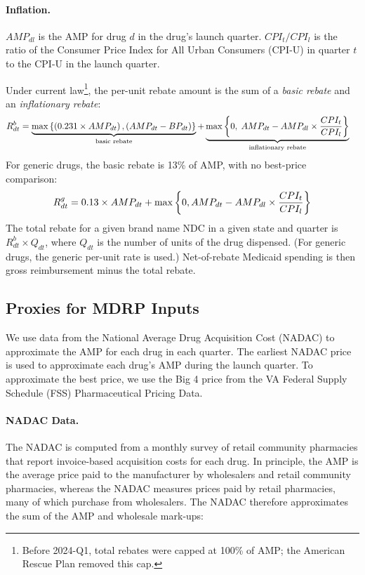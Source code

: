 \paragraph{Inflation.} $AMP_{dl}$ is the AMP for drug $d$ in the drug's launch quarter. $CPI_t / CPI_l$ is the ratio of the Consumer Price Index for All Urban Consumers (CPI-U) in quarter $t$ to the CPI-U in the launch quarter.


Under current law\footnote{Before 2024-Q1, total rebates were capped at 100\% of AMP; the American Rescue Plan removed this cap.}, the per-unit rebate amount is the sum of a \emph{basic rebate} and an \emph{inflationary rebate}:
%
\begin{align*}
R_{dt}^{b} &= \underbrace{\max\bc{\bp{0.231 \times AMP_{dt}},\bp{AMP_{dt} - BP_{dt}}}}_{\text{basic rebate}} + \underbrace{\max\bc{0,\; AMP_{dt} - AMP_{dl} \times \frac{CPI_t}{CPI_l}}}_{\text{inflationary rebate}}
\end{align*}
%
For generic drugs, the basic rebate is 13\% of AMP, with no best-price comparison:
%
\begin{align*}
R_{dt}^{g} = 0.13 \times AMP_{dt} + \max\bc{0, AMP_{dt} - AMP_{dl} \times \frac{CPI_t}{CPI_{l}}}
\end{align*}
%
The total rebate for a given brand name NDC in a given state and quarter is $R_{dt}^{b} \times Q_{dt}$, where $Q_{dt}$ is the number of units of the drug dispensed. (For generic drugs, the generic per-unit rate is used.) Net-of-rebate Medicaid spending is then gross reimbursement minus the total rebate.

\subsection{Proxies for MDRP Inputs}

We use data from the National Average Drug Acquisition Cost (NADAC) to approximate the AMP for each drug in each quarter. The earliest NADAC price is used to approximate each drug's AMP during the launch quarter. To approximate the best price, we use the Big 4 price from the VA Federal Supply Schedule (FSS) Pharmaceutical Pricing Data.

\paragraph{NADAC Data.} The NADAC is computed from a monthly survey of retail community pharmacies that report invoice-based acquisition costs for each drug. In principle, the AMP is the average price paid to the manufacturer by wholesalers and retail community pharmacies, whereas the NADAC measures prices paid by retail pharmacies, many of which purchase from wholesalers. The NADAC therefore approximates the sum of the AMP and wholesale mark-ups:

